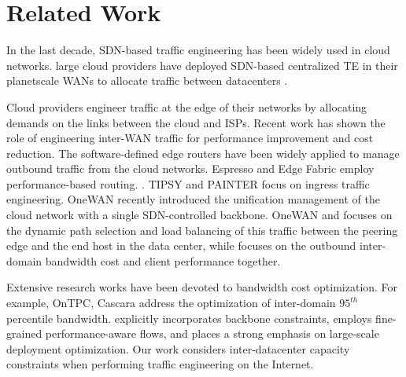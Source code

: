 \section{Related Work}
In the last decade, SDN-based traffic engineering has been widely used in cloud networks.  large cloud
providers have deployed SDN-based centralized TE in their planetscale WANs to allocate traffic between datacenters \cite{hong2013achieving,jain2013B4,li2018trafficshaper,hong2018b4,kandula2014calendaring,laoutaris2011inter,liu2014traffic,jalaparti2016dynamicPretium,bogle2019teavar}. 

Cloud providers engineer traffic
at the edge of their networks by allocating demands on the links
between the cloud and ISPs. Recent work has shown the role of
engineering inter-WAN traffic for performance improvement \cite{yap2017espresso,schlinker2017edgefabric,landa2021staying} and
cost reduction\cite{singh2021costCascara}.
The software-defined edge routers have been widely applied to manage outbound traffic from the cloud networks. Espresso \cite{yap2017espresso} and Edge Fabric \cite{schlinker2017edgefabric,landa2021staying} employ performance-based routing. \cite{liu2016Footprint,valancius2013PECAN,zhang2010optimizingEntact,singh2021costCascara,yap2017espresso,caesar2005design,feamster2003guidelines,gupta2014sdx,schlinker2017edgefabric,krishnaswamy2023onewan,chen2015end,flavel2015fastroute,koch2023painter,markovitch2022tipsy}. TIPSY \cite{markovitch2022tipsy} and PAINTER \cite{koch2023painter} focus on ingress traffic engineering. OneWAN \cite{krishnaswamy2023onewan} recently introduced the unification management of the cloud network with a single SDN-controlled backbone. OneWAN \cite{krishnaswamy2023onewan} and \cite{chen2015end,flavel2015fastroute,zhang2010optimizingEntact} focuses on the dynamic path selection and load balancing of this traffic between the peering edge and the end host in the data center, while {\sys} focuses on the outbound inter-domain bandwidth cost and client performance together.


Extensive research works \cite{singh2021costCascara,jalaparti2016dynamicPretium,goldenberg2004optimizing,zhang2010optimizingEntact,chen2022onlineOnTPC} have been devoted to bandwidth cost optimization. For example, OnTPC, Cascara \cite{chen2022onlineOnTPC, singh2021costCascara, goldenberg2004optimizing} address the optimization of inter-domain $95^{th}$ percentile bandwidth. {\sys} explicitly incorporates backbone constraints, employs fine-grained performance-aware flows, and places a strong emphasis on large-scale deployment optimization. Our work considers inter-datacenter capacity constraints when performing traffic engineering on the Internet. 


